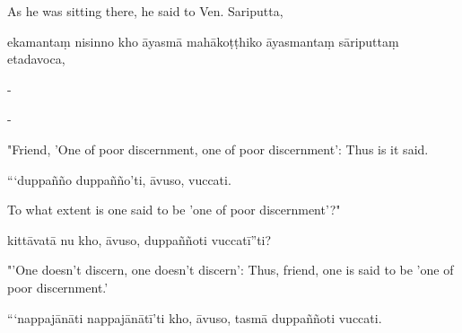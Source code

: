 \begin{samepage}
\begin{leftcolumn*}
As he was sitting there, he said to Ven. Sariputta,
\end{leftcolumn*}

\begin{rightcolumn}
ekamantaṃ nisinno kho āyasmā mahākoṭṭhiko āyasmantaṃ sāriputtaṃ etadavoca,
\end{rightcolumn}
\end{samepage}

\begin{samepage}
\begin{leftcolumn*}
-
\end{leftcolumn*}

\begin{rightcolumn}
-
\end{rightcolumn}
\end{samepage}

\begin{samepage}
\begin{leftcolumn*}
"Friend, 'One of poor discernment, one of poor discernment': Thus is it said.
\end{leftcolumn*}

\begin{rightcolumn}
“‘duppañño duppañño’ti, āvuso, vuccati.
\end{rightcolumn}
\end{samepage}

\begin{samepage}
\begin{leftcolumn*}
To what extent is one said to be 'one of poor discernment'?"
\end{leftcolumn*}

\begin{rightcolumn}
kittāvatā nu kho, āvuso, duppaññoti vuccatī”ti?
\end{rightcolumn}
\end{samepage}

\begin{samepage}
\begin{leftcolumn*}
"'One doesn't discern, one doesn't discern': Thus, friend, one is said to be 'one of poor discernment.'
\end{leftcolumn*}

\begin{rightcolumn}
“‘nappajānāti nappajānātī’ti kho, āvuso, tasmā duppaññoti vuccati.
\end{rightcolumn}
\end{samepage}

